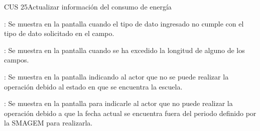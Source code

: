 \begin{UseCase}{CUS 25}{Actualizar información del consumo de energía}
{\begin{UClist}
	    \UCli {}: Se muestra en la pantalla  cuando el tipo de dato ingresado no cumple con el tipo de dato solicitado en el campo.
	    
	    \UCli {}: Se muestra en la pantalla  cuando se ha excedido la longitud de alguno de los campos.	    
	    
	    \UCli  {}: Se muestra en la pantalla  indicando al actor que no se puede realizar la operación debido al estado en que se encuentra la escuela.
	    
	    \UCli {}: Se muestra en la pantalla  para indicarle al actor que no puede realizar la operación debido a que la fecha actual se encuentra fuera del periodo definido por la SMAGEM para realizarla.
	    
	\end{UClist}
    }


\end{UseCase}

